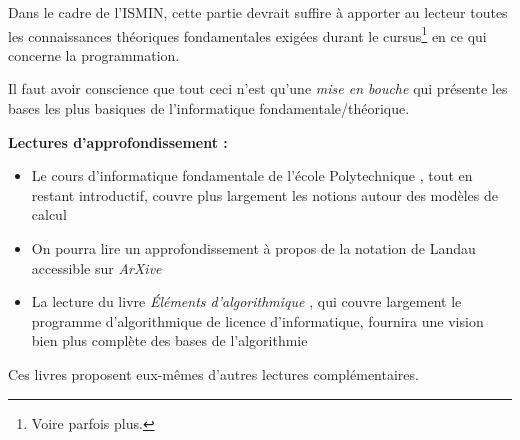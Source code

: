 \documentclass[../../main.tex]{subfiles}
\begin{document}
Dans le cadre de l'ISMIN, cette partie devrait suffire à apporter au lecteur toutes les connaissances théoriques fondamentales exigées durant le cursus\footnote{Voire parfois plus.} en ce qui concerne la programmation.

Il faut avoir conscience que tout ceci n'est qu'une \textit{mise en bouche} qui présente les bases les plus basiques de l'informatique fondamentale/théorique.

\textbf{Lectures d'approfondissement :}
\begin{itemize}
	\item Le cours d'informatique fondamentale de l'école Polytechnique \cite{XFI}, tout en restant introductif, couvre plus largement les notions autour des modèles de calcul
	\item On pourra lire un approfondissement à propos de la notation de Landau \cite{ONotation} accessible sur \textit{ArXive}
	\item La lecture du livre \textit{Éléments d'algorithmique} \cite{EltAlgorithmie}, qui couvre largement le programme d'algorithmique de licence d'informatique, fournira une vision bien plus complète des bases de l'algorithmie
\end{itemize}
Ces livres proposent eux-mêmes d'autres lectures complémentaires.
\end{document}
